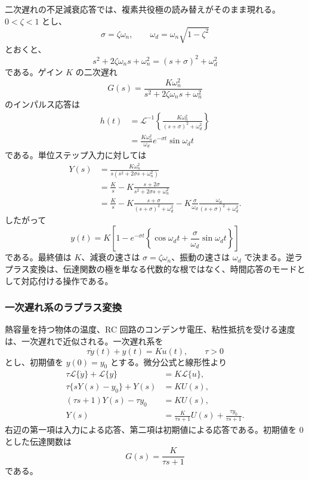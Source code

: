 二次遅れの不足減衰応答では、複素共役極の読み替えがそのまま現れる。$0<\zeta<1$ とし、
\begin{equation}
  \sigma=\zeta\omega_n,\qquad
  \omega_d=\omega_n\sqrt{1-\zeta^2}
\end{equation}
とおくと、
\begin{equation}
  s^2+2\zeta\omega_n s+\omega_n^2
  =(s+\sigma)^2+\omega_d^2
\end{equation}
である。ゲイン $K$ の二次遅れ
\begin{equation}
  G(s)=
  \frac{K\omega_n^2}
       {s^2+2\zeta\omega_n s+\omega_n^2}
\end{equation}
のインパルス応答は
\begin{align}
  h(t)
  &=\mathcal{L}^{-1}\left\{
    \frac{K\omega_n^2}{(s+\sigma)^2+\omega_d^2}
    \right\}\\
  &=\frac{K\omega_n^2}{\omega_d}e^{-\sigma t}\sin\omega_d t
\end{align}
である。単位ステップ入力に対しては
\begin{align}
  Y(s)
  &=\frac{K\omega_n^2}
    {s(s^2+2\sigma s+\omega_n^2)}\\
  &=\frac{K}{s}
    -K\frac{s+2\sigma}{s^2+2\sigma s+\omega_n^2}\\
  &=\frac{K}{s}
    -K\frac{s+\sigma}{(s+\sigma)^2+\omega_d^2}
    -K\frac{\sigma}{\omega_d}
      \frac{\omega_d}{(s+\sigma)^2+\omega_d^2}.
\end{align}
したがって
\begin{equation}
  y(t)
  =
  K\left[
    1-e^{-\sigma t}\left\{
      \cos\omega_d t+\frac{\sigma}{\omega_d}\sin\omega_d t
    \right\}
  \right]
  \label{eq:second-order-step-underdamped}
\end{equation}
である。最終値は $K$、減衰の速さは $\sigma=\zeta\omega_n$、振動の速さは $\omega_d$ で決まる。逆ラプラス変換は、伝達関数の極を単なる代数的な根ではなく、時間応答のモードとして対応付ける操作である。

\subsubsection{一次遅れ系のラプラス変換}

熱容量を持つ物体の温度、RC 回路のコンデンサ電圧、粘性抵抗を受ける速度は、一次遅れで近似される。一次遅れ系を
\begin{equation}
  \tau\dot{y}(t)+y(t)=K u(t),
  \qquad \tau>0
\end{equation}
とし、初期値を $y(0)=y_0$ とする。微分公式と線形性より
\begin{align}
  \tau\mathcal{L}\{\dot{y}\}+\mathcal{L}\{y\}&=K\mathcal{L}\{u\},\\
  \tau\{sY(s)-y_0\}+Y(s)&=KU(s),\\
  (\tau s+1)Y(s)-\tau y_0&=KU(s),\\
  Y(s)&=\frac{K}{\tau s+1}U(s)+\frac{\tau y_0}{\tau s+1}.
  \label{eq:first-order-laplace-general}
\end{align}
右辺の第一項は入力による応答、第二項は初期値による応答である。初期値を 0 とした伝達関数は
\begin{equation}
  G(s)=\frac{K}{\tau s+1}
\end{equation}
である。

